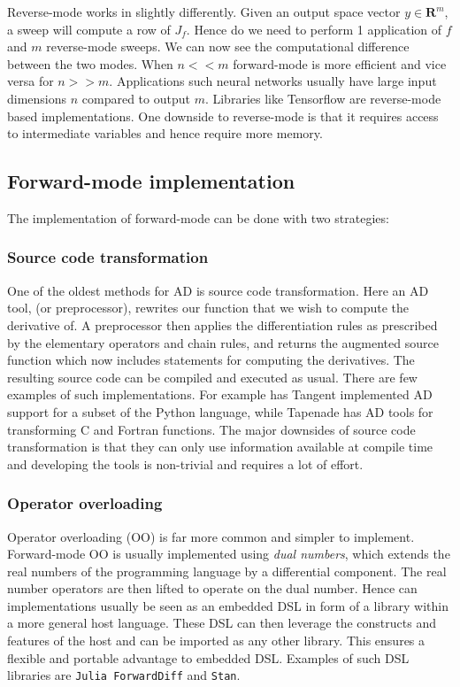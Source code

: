 Reverse-mode works in slightly differently. Given an output space vector $y \in \mathbf{R}^m$, a sweep will compute a 
row of $J_f$. Hence do we need to perform 1 application of $f$ and $m$ reverse-mode sweeps.  We can now see the 
computational difference between the two modes. When $n << m$ forward-mode is more efficient and vice versa for $n >> m$. 
Applications such neural networks usually have large input dimensions $n$ compared to output $m$. 
Libraries like Tensorflow are reverse-mode based implementations. One downside to reverse-mode is that 
it requires access to intermediate variables and hence require more memory. 

\subsection{Forward-mode implementation}
The implementation of forward-mode can be done with two strategies:
\subsubsection*{Source code transformation}
One of the oldest methods for AD is source code transformation. Here an AD tool, (or preprocessor), rewrites our function that we wish to 
compute the derivative of. A preprocessor then applies the differentiation rules as prescribed by the elementary operators and chain rules, 
and returns the augmented source function which now includes statements for computing the derivatives. The resulting source
code can be compiled and executed as usual. There are few examples of such implementations. 
For example has Tangent\cite{DBLP:journals/corr/abs-1711-02712} implemented AD support for a subset of the Python language, 
while Tapenade has AD tools for transforming C and Fortran functions. The major downsides of source code transformation is that 
they can only use information available at compile time and developing the tools is non-trivial and requires a lot of effort. 
	
\subsubsection*{Operator overloading}
Operator overloading (OO) is far more common and simpler to implement.
Forward-mode OO is usually implemented using \emph{dual numbers}, which extends the real numbers 
of the programming language by a differential component. The real number operators are then lifted to
operate on the dual number. Hence can implementations usually be seen as an embedded DSL in form of a library within a 
more general host language. These DSL can then leverage the constructs and features of the host and can be imported
as any other library. This ensures a flexible and portable advantage to embedded DSL. Examples of such DSL libraries are 
\texttt{Julia ForwardDiff}\cite{RevelsLubinPapamarkou2016} and \texttt{Stan}\cite{DBLP:journals/corr/CarpenterHBLLB15}. 



